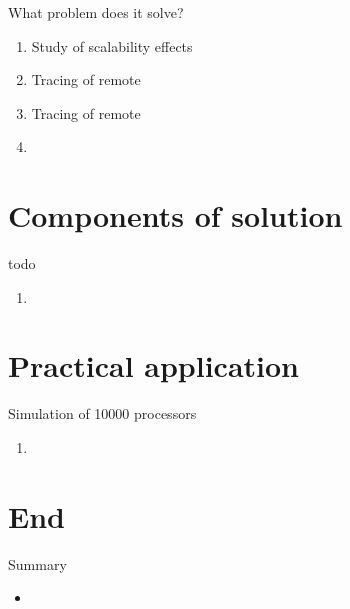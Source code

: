 \begin{frame}{What problem does it solve?}

\begin{enumerate}
    \item Study of scalability effects
    \item Tracing of remote
    \item Tracing of remote
    \item 
\end{enumerate}

\end{frame}



\section{Components of solution}

\begin{frame}{todo}


\begin{enumerate}
    \item 
\end{enumerate}

\end{frame}

\section{Practical application}

\begin{frame}{Simulation of 10000 processors}


\begin{enumerate}
    \item 
\end{enumerate}

\end{frame}


\section{End}

\begin{frame}{Summary}
\begin{itemize}
\item 
\end{itemize}
\end{frame}

